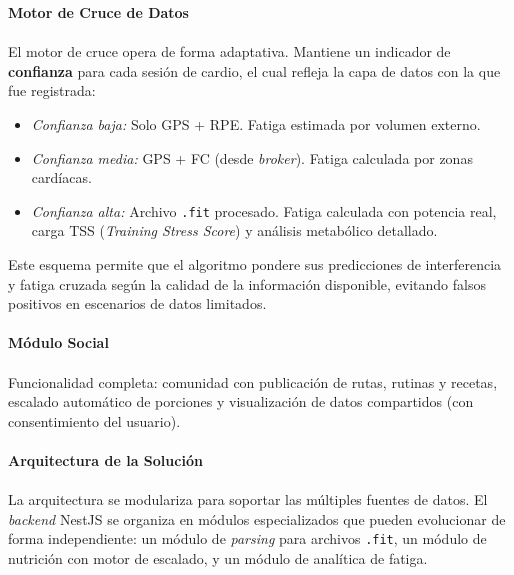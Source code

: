 \documentclass[12pt]{article}
\begin{document}
\textbf{Motor de Cruce de Datos}
\\\\
El motor de cruce opera de forma adaptativa. Mantiene un indicador de \textbf{confianza} para cada sesión de cardio, el cual refleja la capa de datos con la que fue registrada:
\begin{itemize}
    \item \textit{Confianza baja:} Solo GPS + RPE. Fatiga estimada por volumen externo.
    \item \textit{Confianza media:} GPS + FC (desde \textit{broker}). Fatiga calculada por zonas cardíacas.
    \item \textit{Confianza alta:} Archivo \texttt{.fit} procesado. Fatiga calculada con potencia real, carga TSS (\textit{Training Stress Score}) y análisis metabólico detallado.
\end{itemize}
Este esquema permite que el algoritmo pondere sus predicciones de interferencia y fatiga cruzada según la calidad de la información disponible, evitando falsos positivos en escenarios de datos limitados.
\\\\
\textbf{Módulo Social}
\\\\
Funcionalidad completa: comunidad con publicación de rutas, rutinas y recetas, escalado automático de porciones y visualización de datos compartidos (con consentimiento del usuario).
\\\\
\textbf{Arquitectura de la Solución}
\\\\
La arquitectura se modulariza para soportar las múltiples fuentes de datos. El \textit{backend} NestJS se organiza en módulos especializados que pueden evolucionar de forma independiente: un módulo de \textit{parsing} para archivos \texttt{.fit}, un módulo de nutrición con motor de escalado, y un módulo de analítica de fatiga.
\end{document}
